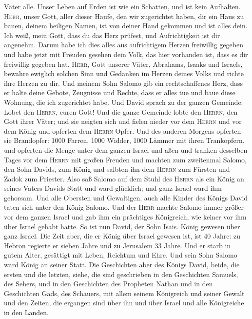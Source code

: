 Väter alle. Unser Leben auf Erden ist wie ein Schatten, und ist kein
Aufhalten.  \textsc{Herr}, unser Gott, aller dieser
Haufe, den wir zugerichtet haben, dir ein Haus zu bauen, deinem heiligen
Namen, ist von deiner Hand gekommen und ist alles dein. 
Ich weiß, mein Gott, dass du das Herz prüfest, und Aufrichtigkeit ist
dir angenehm. Darum habe ich dies alles aus aufrichtigem Herzen
freiwillig gegeben und habe jetzt mit Freuden gesehen dein Volk, das
hier vorhanden ist, dass es dir freiwillig gegeben hat. 
\textsc{Herr}, Gott unserer Väter, Abrahams, Isaaks und Israels, bewahre
ewiglich solchen Sinn und Gedanken im Herzen deines Volks und richte
ihre Herzen zu dir.  Und meinem Sohn Salomo gib ein
rechtschaffenes Herz, dass er halte deine Gebote, Zeugnisse und Rechte,
dass er alles tue und baue diese Wohnung, die ich zugerichtet habe.
 Und David sprach zu der ganzen Gemeinde: Lobet den
\textsc{Herrn}, euren Gott! Und die ganze Gemeinde lobte den
\textsc{Herrn}, den Gott ihrer Väter; und sie neigten sich und fielen
nieder vor dem \textsc{Herrn} und vor dem König  und
opferten dem \textsc{Herrn} Opfer. Und des anderen Morgens opferten sie
Brandopfer: 1000 Farren, 1000 Widder, 1000 Lämmer mit ihren Trankopfern,
und opferten die Menge unter dem ganzen Israel  und aßen
und tranken desselben Tages vor dem \textsc{Herrn} mit großen Freuden
und machten zum zweitenmal Salomo, den Sohn Davids, zum König und
salbten ihn dem \textsc{Herrn} zum Fürsten und Zadok zum Priester.
 Also saß Salomo auf dem Stuhl des \textsc{Herrn} als ein
König an seines Vaters Davids Statt und ward glücklich; und ganz Israel
ward ihm gehorsam.  Und alle Obersten und Gewaltigen,
auch alle Kinder des Königs David taten sich unter den König Salomo.
 Und der \textsc{Herr} machte Salomo immer größer vor dem
ganzen Israel und gab ihm ein prächtiges Königreich, wie keiner vor ihm
über Israel gehabt hatte.  So ist nun David, der Sohn
Isais. König gewesen über ganz Israel.  Die Zeit aber,
die er König über Israel gewesen ist, ist 40 Jahre: zu Hebron regierte
er sieben Jahre und zu Jerusalem 33 Jahre.  Und er starb
in gutem Alter, gesättigt mit Leben, Reichtum und Ehre. Und sein Sohn
Salomo ward König an seiner Statt.  Die Geschichten aber
des Königs David, beide, die ersten und die letzten, siehe, die sind
geschrieben in den Geschichten Samuels, des Sehers, und in den
Geschichten des Propheten Nathan und in den Geschichten Gads, des
Schauers,  mit allem seinem Königreich und seiner Gewalt
und den Zeiten, die ergangen sind über ihn und über Israel und alle
Königreiche in den Landen.
